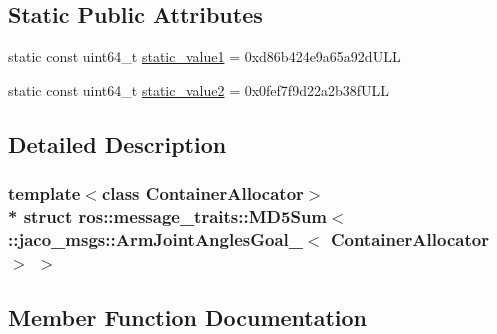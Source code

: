 \subsection*{Static Public Attributes}
\begin{DoxyCompactItemize}
\item 
static const uint64\+\_\+t \hyperlink{structros_1_1message__traits_1_1MD5Sum_3_01_1_1jaco__msgs_1_1ArmJointAnglesGoal___3_01ContainerAllocator_01_4_01_4_ae641530bebc148cc93f985d4e32ae3e5}{static\+\_\+value1} = 0xd86b424e9a65a92d\+U\+LL
\item 
static const uint64\+\_\+t \hyperlink{structros_1_1message__traits_1_1MD5Sum_3_01_1_1jaco__msgs_1_1ArmJointAnglesGoal___3_01ContainerAllocator_01_4_01_4_a1204b6c7638a089ab15d1c1e460e70bd}{static\+\_\+value2} = 0x0fef7f9d22a2b38f\+U\+LL
\end{DoxyCompactItemize}


\subsection{Detailed Description}
\subsubsection*{template$<$class Container\+Allocator$>$\\*
struct ros\+::message\+\_\+traits\+::\+M\+D5\+Sum$<$ \+::jaco\+\_\+msgs\+::\+Arm\+Joint\+Angles\+Goal\+\_\+$<$ Container\+Allocator $>$ $>$}



\subsection{Member Function Documentation}
